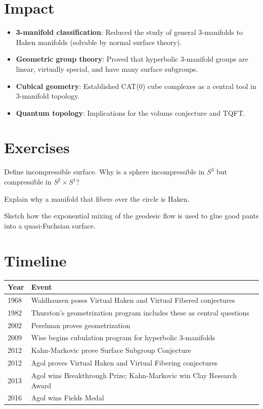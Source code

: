 \section{Impact}
\begin{itemize}
\item \textbf{3-manifold classification}: Reduced the study of general 3-manifolds to Haken manifolds (solvable by normal surface theory).
\item \textbf{Geometric group theory}: Proved that hyperbolic 3-manifold groups are linear, virtually special, and have many surface subgroups.
\item \textbf{Cubical geometry}: Established CAT(0) cube complexes as a central tool in 3-manifold topology.
\item \textbf{Quantum topology}: Implications for the volume conjecture and TQFT.
\end{itemize}

\section{Exercises}

\begin{exercise}[Basic]
Define incompressible surface. Why is a sphere incompressible in $S^3$ but compressible in $S^2 \times S^1$?
\end{exercise}

\begin{exercise}[Intermediate]
Explain why a manifold that fibers over the circle is Haken.
\end{exercise}

\begin{exercise}[Advanced]
Sketch how the exponential mixing of the geodesic flow is used to glue good pants into a quasi-Fuchsian surface.
\end{exercise}

\section{Timeline}

\begin{tabularx}{\linewidth}{lX}
\toprule
\textbf{Year} & \textbf{Event} \\ \midrule
1968 & Waldhausen poses Virtual Haken and Virtual Fibered conjectures \\ 
1982 & Thurston's geometrization program includes these as central questions \\ 
2002 & Perelman proves geometrization \\ 
2009 & Wise begins cubulation program for hyperbolic 3-manifolds \\ 
2012 & Kahn-Markovic prove Surface Subgroup Conjecture \\ 
2012 & Agol proves Virtual Haken and Virtual Fibering conjectures \\ 
2013 & Agol wins Breakthrough Prize; Kahn-Markovic win Clay Research Award \\ 
2016 & Agol wins Fields Medal \\ \bottomrule
\end{tabularx}

